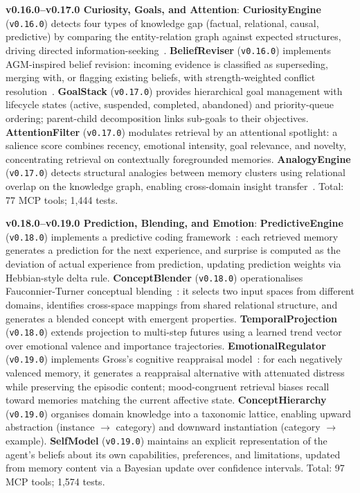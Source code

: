 \documentclass[conference]{IEEEtran}
\begin{document}
\textbf{v0.16.0--v0.17.0 Curiosity, Goals, and Attention}: \textbf{CuriosityEngine} (\texttt{v0.16.0}) detects four types of knowledge gap (factual, relational, causal, predictive) by comparing the entity-relation graph against expected structures, driving directed information-seeking~\cite{loewenstein1994}. \textbf{BeliefReviser} (\texttt{v0.16.0}) implements AGM-inspired belief revision: incoming evidence is classified as superseding, merging with, or flagging existing beliefs, with strength-weighted conflict resolution~\cite{alchourron1985}. \textbf{GoalStack} (\texttt{v0.17.0}) provides hierarchical goal management with lifecycle states (active, suspended, completed, abandoned) and priority-queue ordering; parent-child decomposition links sub-goals to their objectives. \textbf{AttentionFilter} (\texttt{v0.17.0}) modulates retrieval by an attentional spotlight: a salience score combines recency, emotional intensity, goal relevance, and novelty, concentrating retrieval on contextually foregrounded memories. \textbf{AnalogyEngine} (\texttt{v0.17.0}) detects structural analogies between memory clusters using relational overlap on the knowledge graph, enabling cross-domain insight transfer~\cite{gentner1983}. Total: 77 MCP tools; 1,444 tests.

\textbf{v0.18.0--v0.19.0 Prediction, Blending, and Emotion}: \textbf{PredictiveEngine} (\texttt{v0.18.0}) implements a predictive coding framework~\cite{clark2013}: each retrieved memory generates a prediction for the next experience, and surprise is computed as the deviation of actual experience from prediction, updating prediction weights via Hebbian-style delta rule. \textbf{ConceptBlender} (\texttt{v0.18.0}) operationalises Fauconnier-Turner conceptual blending~\cite{fauconnier2002}: it selects two input spaces from different domains, identifies cross-space mappings from shared relational structure, and generates a blended concept with emergent properties. \textbf{TemporalProjection} (\texttt{v0.18.0}) extends projection to multi-step futures using a learned trend vector over emotional valence and importance trajectories. \textbf{EmotionalRegulator} (\texttt{v0.19.0}) implements Gross's cognitive reappraisal model~\cite{gross1998}: for each negatively valenced memory, it generates a reappraisal alternative with attenuated distress while preserving the episodic content; mood-congruent retrieval biases recall toward memories matching the current affective state. \textbf{ConceptHierarchy} (\texttt{v0.19.0}) organises domain knowledge into a taxonomic lattice, enabling upward abstraction (instance $\to$ category) and downward instantiation (category $\to$ example). \textbf{SelfModel} (\texttt{v0.19.0}) maintains an explicit representation of the agent's beliefs about its own capabilities, preferences, and limitations, updated from memory content via a Bayesian update over confidence intervals. Total: 97 MCP tools; 1,574 tests.
\end{document}
